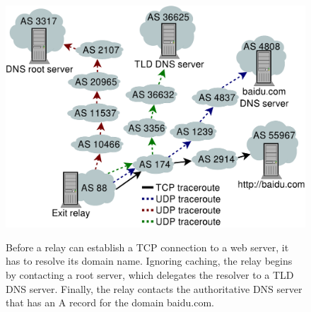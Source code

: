\begin{figure}[t]
	\centering
	\includegraphics[width=\linewidth]{figures/as-exposure.pdf}
	\label{fig:as-exposure}
	\caption{Before a relay can establish a TCP connection to a web server, it
		has to resolve its domain name.  Ignoring caching, the relay begins by
		contacting a root server, which delegates the resolver to a TLD DNS
		server.  Finally, the relay contacts the authoritative DNS server that
		has an A record for the domain baidu.com.}
\end{figure}

